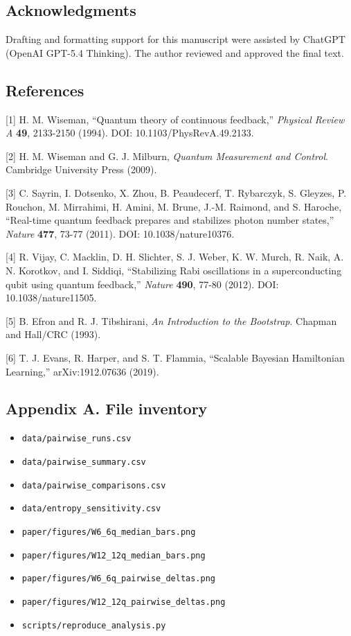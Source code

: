 \documentclass[
]{article}
\providecommand{\tightlist}{%
  \setlength{\itemsep}{0pt}\setlength{\parskip}{0pt}}
\begin{document}
\subsection{Acknowledgments}\label{acknowledgments}

Drafting and formatting support for this manuscript were assisted by
ChatGPT (OpenAI GPT-5.4 Thinking). The author reviewed and approved the
final text.

\subsection{References}\label{references}

{[}1{]} H. M. Wiseman, ``Quantum theory of continuous feedback,''
\emph{Physical Review A} \textbf{49}, 2133-2150 (1994). DOI:
10.1103/PhysRevA.49.2133.

{[}2{]} H. M. Wiseman and G. J. Milburn, \emph{Quantum Measurement and
Control}. Cambridge University Press (2009).

{[}3{]} C. Sayrin, I. Dotsenko, X. Zhou, B. Peaudecerf, T. Rybarczyk, S.
Gleyzes, P. Rouchon, M. Mirrahimi, H. Amini, M. Brune, J.-M. Raimond,
and S. Haroche, ``Real-time quantum feedback prepares and stabilizes
photon number states,'' \emph{Nature} \textbf{477}, 73-77 (2011). DOI:
10.1038/nature10376.

{[}4{]} R. Vijay, C. Macklin, D. H. Slichter, S. J. Weber, K. W. Murch,
R. Naik, A. N. Korotkov, and I. Siddiqi, ``Stabilizing Rabi oscillations
in a superconducting qubit using quantum feedback,'' \emph{Nature}
\textbf{490}, 77-80 (2012). DOI: 10.1038/nature11505.

{[}5{]} B. Efron and R. J. Tibshirani, \emph{An Introduction to the
Bootstrap}. Chapman and Hall/CRC (1993).

{[}6{]} T. J. Evans, R. Harper, and S. T. Flammia, ``Scalable Bayesian
Hamiltonian Learning,'' arXiv:1912.07636 (2019).

\subsection{Appendix A. File
inventory}\label{appendix-a.-file-inventory}

\begin{itemize}
\tightlist
\item
  \texttt{data/pairwise\_runs.csv}
\item
  \texttt{data/pairwise\_summary.csv}
\item
  \texttt{data/pairwise\_comparisons.csv}
\item
  \texttt{data/entropy\_sensitivity.csv}
\item
  \texttt{paper/figures/W6\_6q\_median\_bars.png}
\item
  \texttt{paper/figures/W12\_12q\_median\_bars.png}
\item
  \texttt{paper/figures/W6\_6q\_pairwise\_deltas.png}
\item
  \texttt{paper/figures/W12\_12q\_pairwise\_deltas.png}
\item
  \texttt{scripts/reproduce\_analysis.py}
\end{itemize}
\end{document}
